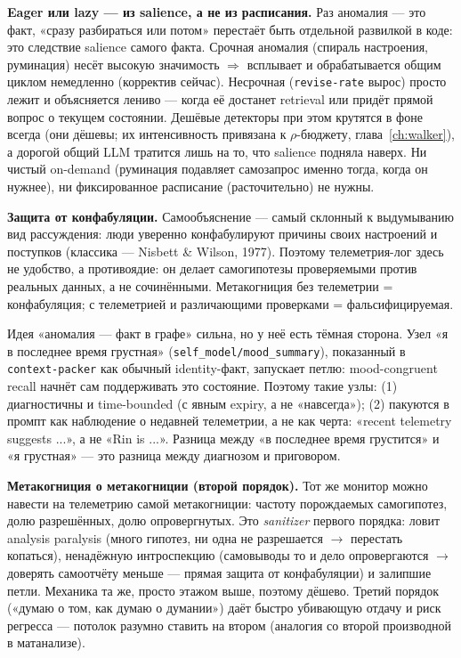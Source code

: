 \smallskip\noindent\textbf{Eager или lazy --- из salience, а не из расписания.}
Раз аномалия --- это факт, «сразу разбираться или потом» перестаёт быть
отдельной развилкой в коде: это следствие salience самого факта. Срочная
аномалия (спираль настроения, руминация) несёт высокую значимость
$\Rightarrow$ всплывает и обрабатывается общим циклом немедленно (корректив
сейчас). Несрочная (\texttt{revise-rate} вырос) просто лежит и объясняется
лениво --- когда её достанет retrieval или придёт прямой вопрос о текущем
состоянии. Дешёвые детекторы при этом крутятся в фоне всегда (они дёшевы; их
интенсивность привязана к $\rho$-бюджету, глава~\ref{ch:walker}), а дорогой
общий LLM тратится лишь на то, что salience подняла наверх. Ни чистый
on-demand (руминация подавляет самозапрос именно тогда, когда он нужнее), ни
фиксированное расписание (расточительно) не нужны.

\smallskip\noindent\textbf{Защита от конфабуляции.}
Самообъяснение --- самый склонный к выдумыванию вид рассуждения: люди уверенно
конфабулируют причины своих настроений и поступков (классика --- Nisbett \&
Wilson, 1977). Поэтому телеметрия-лог здесь не удобство, а противоядие: он
делает самогипотезы проверяемыми против реальных данных, а не сочинёнными.
Метакогниция без телеметрии = конфабуляция; с телеметрией и различающими
проверками = фальсифицируемая.

\begin{pitfall}
Идея «аномалия --- факт в графе» сильна, но у неё есть тёмная сторона. Узел «я
в последнее время грустная» (\texttt{self\_model/mood\_summary}), показанный в
\texttt{context-packer} как обычный identity-факт, запускает петлю:
mood-congruent recall начнёт сам поддерживать это состояние. Поэтому такие
узлы: (1) диагностичны и time-bounded (с явным expiry, а не «навсегда»); (2)
пакуются в промпт как наблюдение о недавней телеметрии, а не как черта:
«recent telemetry suggests ...», а не «Rin is ...». Разница между «в последнее
время грустится» и «я грустная» --- это разница между диагнозом и приговором.
\end{pitfall}

\smallskip\noindent\textbf{Метакогниция о метакогниции (второй порядок).}
Тот же монитор можно навести на телеметрию самой метакогниции: частоту
порождаемых самогипотез, долю разрешённых, долю опровергнутых. Это
\textit{sanitizer} первого порядка: ловит analysis paralysis (много гипотез, ни
одна не разрешается $\to$ перестать копаться), ненадёжную интроспекцию
(самовыводы то и дело опровергаются $\to$ доверять самоотчёту меньше ---
прямая защита от конфабуляции) и залипшие петли. Механика та же, просто этажом
выше, поэтому дёшево. Третий порядок («думаю о том, как думаю о думании»)
даёт быстро убивающую отдачу и риск регресса --- потолок разумно ставить на
втором (аналогия со второй производной в матанализе).

